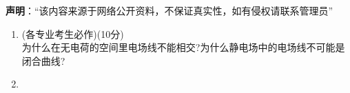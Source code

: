 
\textbf{声明}：“该内容来源于网络公开资料，不保证真实性，如有侵权请联系管理员”

\begin{enumerate}
\item (各专业考生必作)(10分)\\
为什么在无电荷的空间里电场线不能相交?为什么静电场中的电场线不可能是闭合曲线?
\item 


\end{enumerate}